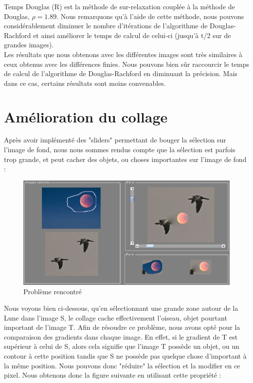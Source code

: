 \newline 
Temps Douglas (R) est la méthode de sur-relaxation couplée à la méthode de Douglas, $\rho = 1.89$. Nous remarquons qu'à l'aide de cette méthode, nous pouvons considérablement diminuer le nombre d'itérations de l'algorithme de Douglas-Rachford et ainsi améliorer le temps de calcul de celui-ci (jusqu'à t/2 sur de grandes images).\\
Les résultats que nous obtenons avec les différentes images sont très similaires à ceux obtenus avec les différences finies. Nous pouvons bien sûr raccourcir le temps de calcul de l'algorithme de Douglas-Rachford en diminuant la précision. Mais dans ce cas, certains résultats sont moins convenables.
\section{Amélioration du collage}
Après avoir implémenté des "sliders" permettant de bouger la sélection sur l'image de fond, nous nous sommes rendus compte que la sélection est parfois trop grande, et peut cacher des objets, ou choses importantes sur l'image de fond : 
\begin{figure}[!htb]
\centering
\includegraphics[scale=0.25]{Images/pb.png}
\caption{Problème rencontré}
\end{figure}
Nous voyons bien ci-dessous, qu'en sélectionnant une grande zone autour de la Lune dans l'image S, le collage cache effectivement l'oiseau, objet pourtant important de l'image T. Afin de résoudre ce problème, nous avons opté pour la comparaison des gradients dans chaque image. En effet, si le gradient de T est supérieur à celui de S, alors cela signifie que l'image T possède un objet, ou un contour à cette position tandis que S ne possède pas quelque chose d'important à la même position. Nous pouvons donc "réduire" la sélection et la modifier en ce pixel. Nous obtenons donc la figure suivante en utilisant cette propriété :
